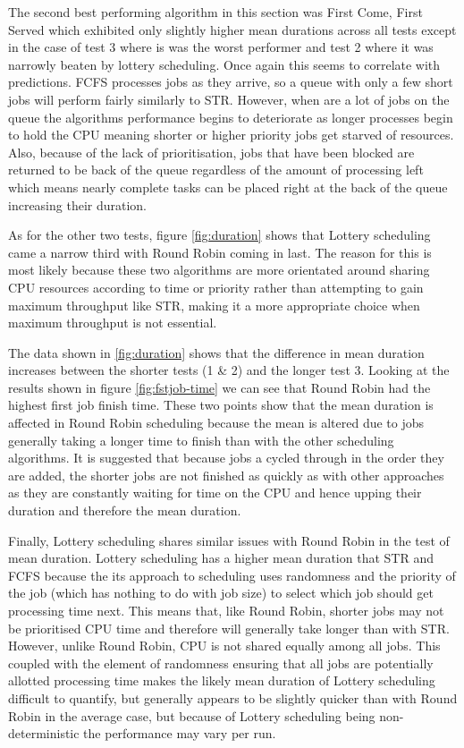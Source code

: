 \documentclass{acm_proc_article-sp}
\begin{document}
The second best performing algorithm in this section was First Come, First Served which exhibited only slightly higher mean durations across all tests except in the case of test 3 where is was the worst performer and test 2 where it was narrowly beaten by lottery scheduling. Once again this seems to correlate with predictions. FCFS processes jobs as they arrive, so a queue with only a few short jobs will perform fairly similarly to STR. However, when are a lot of jobs on the queue the algorithms performance begins to deteriorate as longer processes begin to hold the CPU meaning shorter or higher priority jobs get starved of resources. Also, because of the lack of prioritisation, jobs that have been blocked are returned to be back of the queue regardless of the amount of processing left which means nearly complete tasks can be placed right at the back of the queue increasing their duration.

As for the other two tests, figure \ref{fig:duration} shows that Lottery scheduling came a narrow third with Round Robin coming in last. The reason for this is most likely because these two algorithms are more orientated around sharing CPU resources according to time or priority rather than attempting to gain maximum throughput like STR, making it a more appropriate choice when maximum throughput is not essential.

The data shown in \ref{fig:duration} shows that the difference in mean duration increases between the shorter tests (1 \& 2) and the longer test 3. Looking at the results shown in figure \ref{fig:fstjob-time} we can see that Round Robin had the highest first job finish time. These two points show that the mean duration is affected in Round Robin scheduling because the mean is altered due to jobs generally taking a longer time to finish than with the other scheduling algorithms. It is suggested that because jobs a cycled through in the order they are added, the shorter jobs are not finished as quickly as with other approaches as they are constantly waiting for time on the CPU and hence upping their duration and therefore the mean duration.

Finally, Lottery scheduling shares similar issues with Round Robin in the test of mean duration. Lottery scheduling has a higher mean duration that STR and FCFS because the its approach to scheduling uses randomness and the priority of the job (which has nothing to do with job size) to select which job should get processing time next. This means that, like Round Robin, shorter jobs may not be prioritised CPU time and therefore will generally take longer than with STR. However, unlike Round Robin, CPU is not shared equally among all jobs. This coupled with the element of randomness ensuring that all jobs are potentially allotted processing time makes the likely mean duration of Lottery scheduling difficult to quantify, but generally appears to be slightly quicker than with Round Robin in the average case, but because of Lottery scheduling being non-deterministic the performance may vary per run.
\end{document}
